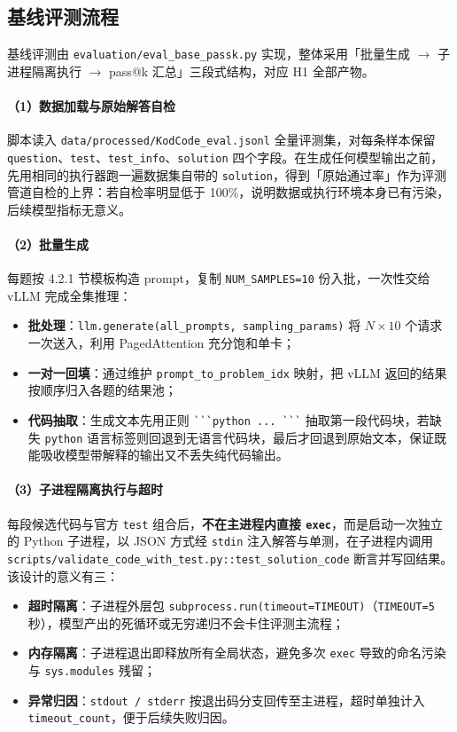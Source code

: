 \subsection{基线评测流程}

基线评测由 \texttt{evaluation/eval\_base\_passk.py} 实现，整体采用「批量生成 $\to$ 子进程隔离执行 $\to$ pass@k 汇总」三段式结构，对应 H1 全部产物。

\paragraph{（1）数据加载与原始解答自检}
脚本读入 \texttt{data/processed/KodCode\_eval.jsonl} 全量评测集，对每条样本保留 \texttt{question}、\texttt{test}、\texttt{test\_info}、\texttt{solution} 四个字段。在生成任何模型输出之前，先用相同的执行器跑一遍数据集自带的 \texttt{solution}，得到「原始通过率」作为评测管道自检的上界：若自检率明显低于 100\%，说明数据或执行环境本身已有污染，后续模型指标无意义。

\paragraph{（2）批量生成}
每题按 4.2.1 节模板构造 prompt，复制 \texttt{NUM\_SAMPLES=10} 份入批，一次性交给 vLLM 完成全集推理：
\begin{itemize}
    \item \textbf{批处理}：\texttt{llm.generate(all\_prompts, sampling\_params)} 将 $N \times 10$ 个请求一次送入，利用 PagedAttention 充分饱和单卡；
    \item \textbf{一对一回填}：通过维护 \texttt{prompt\_to\_problem\_idx} 映射，把 vLLM 返回的结果按顺序归入各题的结果池；
    \item \textbf{代码抽取}：生成文本先用正则 \verb|```python ... ```| 抽取第一段代码块，若缺失 \texttt{python} 语言标签则回退到无语言代码块，最后才回退到原始文本，保证既能吸收模型带解释的输出又不丢失纯代码输出。
\end{itemize}

\paragraph{（3）子进程隔离执行与超时}
每段候选代码与官方 \texttt{test} 组合后，\textbf{不在主进程内直接 \texttt{exec}}，而是启动一次独立的 Python 子进程，以 JSON 方式经 \texttt{stdin} 注入解答与单测，在子进程内调用 \texttt{scripts/validate\_code\_with\_test.py::test\_solution\_code} 断言并写回结果。该设计的意义有三：
\begin{itemize}
    \item \textbf{超时隔离}：子进程外层包 \texttt{subprocess.run(timeout=TIMEOUT)}（\texttt{TIMEOUT=5} 秒），模型产出的死循环或无穷递归不会卡住评测主流程；
    \item \textbf{内存隔离}：子进程退出即释放所有全局状态，避免多次 \texttt{exec} 导致的命名污染与 \texttt{sys.modules} 残留；
    \item \textbf{异常归因}：\texttt{stdout / stderr} 按退出码分支回传至主进程，超时单独计入 \texttt{timeout\_count}，便于后续失败归因。
\end{itemize}

